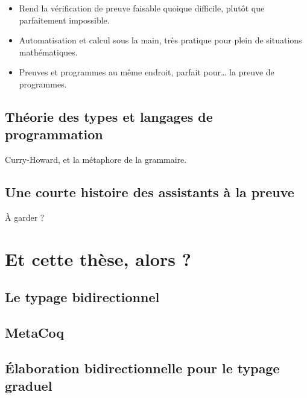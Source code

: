 \begin{itemize}
  \item Rend la vérification de preuve faisable quoique difficile, plutôt que parfaitement impossible.
  \item Automatisation et calcul sous la main, très pratique pour plein de situations mathématiques.
  \item Preuves et programmes au même endroit, parfait pour… la preuve de programmes.
\end{itemize}

\subsection{Théorie des types et langages de programmation}

Curry-Howard, et la métaphore de la grammaire.

\subsection{Une courte histoire des assistants à la preuve}

À garder ?

\section{Et cette thèse, alors ?}
\label{sec:cette-these}

\subsection{Le typage bidirectionnel}

\subsection{MetaCoq}

\subsection{Élaboration bidirectionnelle pour le typage graduel}
